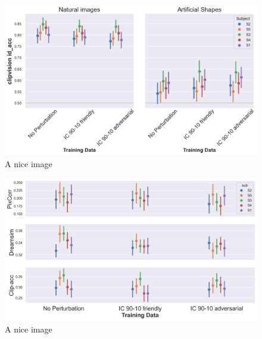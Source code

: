 \begin{figure}[ht]
    \centering
    \includegraphics[width=1\textwidth]{plots/advpert_translator_ic_90-10.png}
    \caption{A nice image}\label{fig:advpert_translator_ic_90}
\end{figure}




\begin{figure}[ht]
    \centering
    \includegraphics[width=1\textwidth]{plots/advpert_reconstruction_test_ic_90-10.png}
    \caption{A nice image}\label{fig:advpert_reconstruction_test_ic_90}
\end{figure}

